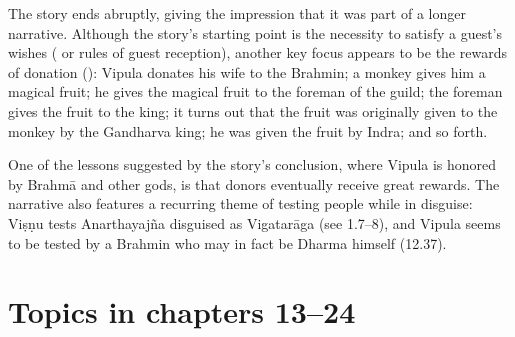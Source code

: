 The story ends abruptly, giving the impression that it was
part of a longer narrative. Although the story's starting point
is the necessity to satisfy a guest's wishes ( or 
rules of guest reception), another key focus appears to 
be the rewards of donation (): Vipula donates his wife to the Brahmin;
a monkey gives him a magical fruit; he gives the magical fruit to the foreman of 
the guild; the foreman gives the fruit to the king; it turns out that the
fruit was originally given to the monkey by the Gandharva king; he
was given the fruit by Indra; and so forth. 
    
One of the lessons suggested by the story’s conclusion, 
where Vipula is honored by Brahmā and other gods, 
is that donors eventually receive great rewards. 
The narrative also features a recurring theme of testing people while in disguise: Viṣṇu tests Anarthayajña disguised as Vigatarāga (see 1.7–8), and Vipula seems to be tested by a Brahmin who may in fact be Dharma himself (12.37).

\section{Topics in chapters 13--24}\label{contentsof12_24}

\vfill
\pagebreak






